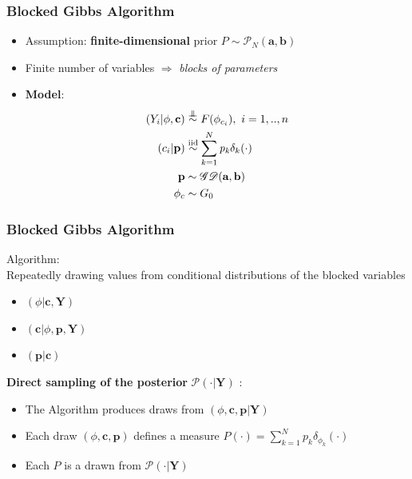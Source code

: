 \begin{frame}
	\frametitle{Blocked Gibbs Algorithm}
	\begin{itemize}
	    \item Assumption: \textbf{finite-dimensional} prior  $P \sim  \mathscr{P}_{N}(\textbf{a},\textbf{b})$
	
        \item Finite number of variables $\Rightarrow$ \textit{blocks of parameters} \\
        \item \textbf{Model}:\\
        \begin{align*}
            (Y_{i}|\mathbf{\phi},\mathbf{c})&\indsim F(\phi_{c_{i}}) , \ i=1,..,n \\
            (c_{i}|\mathbf{p})&\iidsim\sum\limits_{k=1}^N \mathit{p_{k}}\delta_{k}(\cdot)\\
            \mathbf{p} &\sim \mathscr{GD}(\textbf{a},\textbf{b}) \\
            \mathbf{\phi}_{c} & \sim G_{0}
        \end{align*}



	\end{itemize}
\end{frame}




\begin{frame}
	\frametitle{Blocked Gibbs Algorithm}
	Algorithm: \\
	Repeatedly drawing values from conditional distributions of the blocked variables

	\begin{itemize}
    	\item $(\phi | \textbf{c}, \textbf{Y})$
	    \item $(\textbf{c}| \phi,\textbf{p}, \textbf{Y})$
    	\item $(\textbf{p}| \textbf{c})$
	\end{itemize}

	\textbf{Direct sampling of the posterior} $\mathscr{P}(\cdot|\mathbf{Y})$ :\\

	\begin{itemize}
    	\item The Algorithm produces draws from $(\phi,\textbf{c},\textbf{p}| \textbf{Y})$ \\
		\item Each draw $(\phi,\textbf{c},\textbf{p})$ defines a measure $P(\cdot)= \sum\limits_{k=1}^N  \mathit{p_{k}}\delta_{\phi_{k}}(\cdot) $
		\item Each $P$ is a drawn from $\mathscr{P}(\cdot|\mathbf{Y})$
	\end{itemize}
\end{frame}

